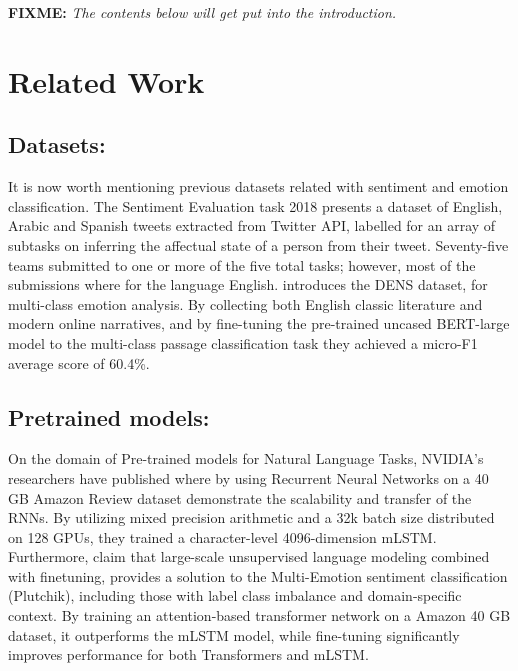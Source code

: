 \documentclass[11pt]{article}
\newcommand{\fixme}[1]{{\color{red} \textbf{FIXME:} {\textit {#1}}}}
\begin{document}
{ \color{blue} \lipsum[1-2] }


\newpage
\fixme{The contents below will get put into the introduction.}
\section{Related Work}
\label{sec:related}
\subsection{Datasets:}
It is now worth mentioning previous datasets related with sentiment and emotion classification. The Sentiment Evaluation task 2018 \cite{mohammad-etal-2018-semeval} presents a dataset of English, Arabic and Spanish tweets extracted from Twitter API, labelled for an array of subtasks on inferring the affectual state of a person from their tweet. Seventy-five teams submitted to one or more of the five total tasks; however, most of the submissions where for the language English. 
\cite{liu2019dens} introduces the DENS dataset, for multi-class emotion analysis. By collecting both English classic literature and modern online narratives, and by fine-tuning the pre-trained uncased BERT-large model to the multi-class passage classification task they achieved a micro-F1 average score of 60.4\%.

\subsection{Pretrained models:}
On the domain of Pre-trained models for Natural Language Tasks, NVIDIA's researchers have published 
\cite{puri2018large} where by using Recurrent Neural Networks on a 40 GB Amazon Review dataset demonstrate 
the scalability and transfer of the RNNs. By utilizing mixed precision arithmetic and 
a 32k batch size distributed on 128 GPUs, they trained a character-level 4096-dimension mLSTM.
Furthermore, \cite{kant2018practical} claim that large-scale unsupervised language modeling combined 
with finetuning, provides a solution to the Multi-Emotion sentiment classification (Plutchik),
including those with label class imbalance and domain-specific context. By training an attention-based
transformer network on a Amazon 40 GB dataset, it outperforms the mLSTM model, while fine-tuning significantly 
improves performance for both Transformers and mLSTM.
\end{document}
